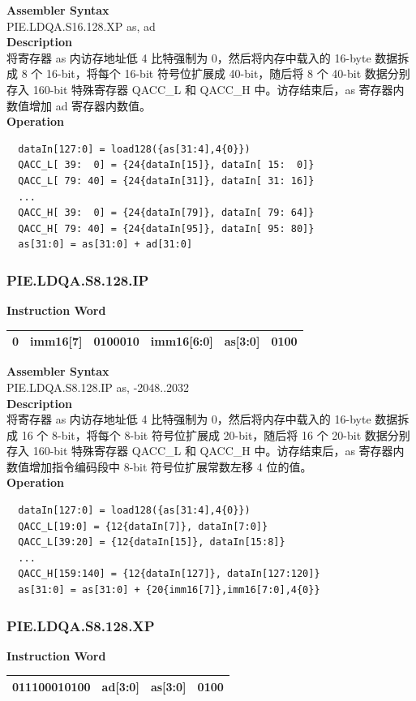 \textbf{Assembler Syntax} \\
PIE.LDQA.S16.128.XP as, ad \\
\textbf{Description} \\
将寄存器 as 内访存地址低 4 比特强制为 0，然后将内存中载入的 16-byte 数据拆成 8 个 16-bit，将每个 16-bit 符号位扩展成 40-bit，随后将 8 个 40-bit 数据分别存入 160-bit 特殊寄存器 QACC\_L 和 QACC\_H 中。访存结束后，as 寄存器内数值增加 ad 寄存器内数值。\\
\textbf{Operation}
\begin{lstlisting}
  dataIn[127:0] = load128({as[31:4],4{0}})
  QACC_L[ 39:  0] = {24{dataIn[15]}, dataIn[ 15:  0]}
  QACC_L[ 79: 40] = {24{dataIn[31]}, dataIn[ 31: 16]}
  ...
  QACC_H[ 39:  0] = {24{dataIn[79]}, dataIn[ 79: 64]}
  QACC_H[ 79: 40] = {24{dataIn[95]}, dataIn[ 95: 80]}
  as[31:0] = as[31:0] + ad[31:0]
\end{lstlisting}

\newpage
\subsubsection{PIE.LDQA.S8.128.IP}\label{instruction:PIELDQAS8128IP}
\setlength\tabcolsep{6pt}
\textbf{Instruction Word} \\
\begin{tabular}{|c|c|c|c|c|c|}
	\hline
	0 & imm16[7] & 0100010 & imm16[6:0] & as[3:0] & 0100 \\
	\hline
\end{tabular}

\textbf{Assembler Syntax} \\
PIE.LDQA.S8.128.IP as, -2048..2032 \\
\textbf{Description} \\
将寄存器 as 内访存地址低 4 比特强制为 0，然后将内存中载入的 16-byte 数据拆成 16 个 8-bit，将每个 8-bit 符号位扩展成 20-bit，随后将 16 个 20-bit 数据分别存入 160-bit 特殊寄存器 QACC\_L 和 QACC\_H 中。访存结束后，as 寄存器内数值增加指令编码段中 8-bit 符号位扩展常数左移 4 位的值。\\
\textbf{Operation}
\begin{lstlisting}
  dataIn[127:0] = load128({as[31:4],4{0}})
  QACC_L[19:0] = {12{dataIn[7]}, dataIn[7:0]}
  QACC_L[39:20] = {12{dataIn[15]}, dataIn[15:8]}
  ...
  QACC_H[159:140] = {12{dataIn[127]}, dataIn[127:120]}
  as[31:0] = as[31:0] + {20{imm16[7]},imm16[7:0],4{0}}
\end{lstlisting}

\newpage
\subsubsection{PIE.LDQA.S8.128.XP}\label{instruction:PIELDQAS8128XP}
\setlength\tabcolsep{6pt}
\textbf{Instruction Word} \\
\begin{tabular}{|c|c|c|c|}
	\hline
	011100010100 & ad[3:0] & as[3:0] & 0100 \\
	\hline
\end{tabular}


